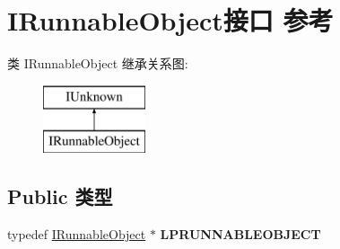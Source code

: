 \hypertarget{interface_i_runnable_object}{}\section{I\+Runnable\+Object接口 参考}
\label{interface_i_runnable_object}
类 I\+Runnable\+Object 继承关系图\+:\begin{figure}[H]
\begin{center}
\leavevmode
\includegraphics[height=2.000000cm]{interface_i_runnable_object}
\end{center}
\end{figure}
\subsection*{Public 类型}
\begin{DoxyCompactItemize}
\item 
\mbox{\label{interface_i_runnable_object_a7dc0ee6cda6f5790584365c49546528c}} 
typedef \hyperlink{interface_i_runnable_object}{I\+Runnable\+Object} $\ast$ {\bfseries L\+P\+R\+U\+N\+N\+A\+B\+L\+E\+O\+B\+J\+E\+CT}
\end{DoxyCompactItemize}
